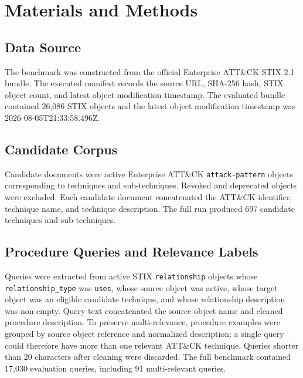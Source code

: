 \documentclass[conference]{IEEEtran}
\begin{document}
\section{Materials and Methods}
\subsection{Data Source}
The benchmark was constructed from the official Enterprise ATT\&CK STIX 2.1 bundle. The executed manifest records the source URL, SHA-256 hash, STIX object count, and latest object modification timestamp. The evaluated bundle contained 26,086 STIX objects and the latest object modification timestamp was 2026-08-05T21:33:58.496Z.

\subsection{Candidate Corpus}
Candidate documents were active Enterprise ATT\&CK \texttt{attack-pattern} objects corresponding to techniques and sub-techniques. Revoked and deprecated objects were excluded. Each candidate document concatenated the ATT\&CK identifier, technique name, and technique description. The full run produced 697 candidate techniques and sub-techniques.

\subsection{Procedure Queries and Relevance Labels}
Queries were extracted from active STIX \texttt{relationship} objects whose \texttt{relationship\_type} was \texttt{uses}, whose source object was active, whose target object was an eligible candidate technique, and whose relationship description was non-empty. Query text concatenated the source object name and cleaned procedure description. To preserve multi-relevance, procedure examples were grouped by source object reference and normalized description; a single query could therefore have more than one relevant ATT\&CK technique. Queries shorter than 20 characters after cleaning were discarded. The full benchmark contained 17,030 evaluation queries, including 91 multi-relevant queries.
\end{document}
